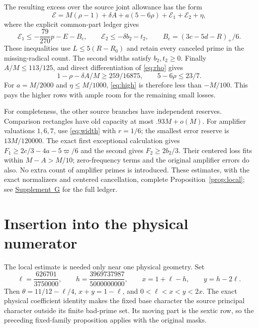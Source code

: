 \documentclass[11pt]{article}
\newcommand{\supp}[1]{\href{supplement.pdf}{Supplement~#1}}
\begin{document}
The resulting excess over the source joint allowance has the form
\begin{equation}\label{eq:high}
 \mathcal E=M(\rho-1)+\delta A+a(5-6\rho)
               +\mathcal E_1+\mathcal E_2+\eta,
\end{equation}
where the explicit common-part ledger gives
\[
 \mathcal E_1\le-\frac{79}{270}p-E-B_c,\qquad
 \mathcal E_2\le-\delta b_2-t_2,
 \qquad B_c=(3c-5d-R)_+/6.
\]
These inequalities use $L\le5(R-R_0)$ and retain every canceled prime
in the missing-radical count. The second widths satisfy $b_2,t_2\ge0$.
Finally $A/M\le113/125$, and direct differentiation of \eqref{eq:rho}
gives
\[
 1-\rho-\delta A/M\ge259/16875,\qquad 5-6\rho\le23/7.
\]
For $a=M/2000$ and $\eta\le M/1000$, \eqref{eq:high} is therefore
less than $-M/100$. This pays the higher rows with ample room for the
remaining small losses.

For completeness, the other source branches have independent reserves.
Comparison rectangles have old capacity at most $.93M+o(M)$.
For amplifier valuations $1,6,7$, use \eqref{eq:width} with $r=1/6$;
the smallest error reserve is $13M/120000$. The exact first exceptional
calculation gives $F_1\ge2c/3-4a-5\varpi/6$ and the second gives
$F_2\ge2b_2/3$. Their centered loss fits within $M-A>M/10$;
zero-frequency terms and the original amplifier errors do also.
No extra count of amplifier primes is introduced. These estimates,
with the exact normalizers and centered cancellation, complete
Proposition~\ref{prop:local}; see \supp{G} for the full ledger.

\section{Insertion into the physical numerator}\label{sec:physical}

The local estimate is needed only near one physical geometry. Set
\begin{equation}\label{eq:geometry}
 \ell=\frac{626701}{3750000},\qquad
 h=\frac{3969737987}{5000000000},\qquad
 x=1+\ell-h,\qquad y=h-2\ell.
\end{equation}
Then $\theta=11/12-\ell/4$, $x+y=1-\ell$, and
$0<\ell<x<y<2x$. The exact physical coefficient identity makes the
fixed base character the source principal character outside its finite
bad-prime set. Its moving part is the sextic row, so the preceding
fixed-family proposition applies with the original masks.
\end{document}
